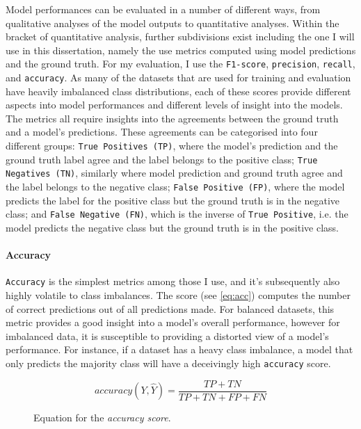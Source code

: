 Model performances can be evaluated in a number of different ways, from qualitative analyses of the model outputs to quantitative analyses. Within the bracket of quantitative analysis, further subdivisions exist including the one I will use in this dissertation, namely the use metrics computed using model predictions and the ground truth.
For my evaluation, I use the \texttt{F1-score}, \texttt{precision}, \texttt{recall}, and \texttt{accuracy}. As many of the datasets that are used for training and evaluation have heavily imbalanced class distributions, each of these scores provide different aspects into model performances and different levels of insight into the models.
The metrics all require insights into the agreements between the ground truth and a model's predictions. These agreements can be categorised into four different groups:
\texttt{True Positives (TP)}, where the model's prediction and the ground truth label agree and the label belongs to the positive class; \texttt{True Negatives (TN)}, similarly where model prediction and ground truth agree and the label belongs to the negative class; \texttt{False Positive (FP)}, where the model predicts the label for the positive class but the ground truth is in the negative class; and \texttt{False Negative (FN)}, which is the inverse of \texttt{True Positive}, i.e. the model predicts the negative class but the ground truth is in the positive class.

\paragraph{Accuracy}
\texttt{Accuracy} is the simplest metrics among those I use, and it's subsequently also highly volatile to class imbalances.
The score (see \cref{eq:acc}) computes the number of correct predictions out of all predictions made. For balanced datasets, this metric provides a good insight into a model's overall performance, however for imbalanced data, it is susceptible to providing a distorted view of a model's performance. For instance, if a dataset has a heavy class imbalance, a model that only predicts the majority class will have a deceivingly high \texttt{accuracy} score.

\begin{figure}[h]
  \begin{equation}\label{eq:acc}
    accuracy(Y,\hat{Y}) = \frac{TP + TN}{TP + TN + FP + FN}
  \end{equation}
  \caption{Equation for the \textit{accuracy score}.}
\end{figure}

